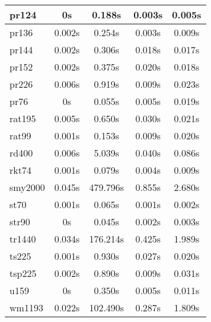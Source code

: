 \begin{longtable}{|l||c|c|c|c|}
  \hline
  pr124 & 0s & 0.188s & 0.003s & 0.005s \\
  \hline
  pr136 & 0.002s & 0.254s & 0.003s & 0.009s \\
  \hline
  pr144 & 0.002s & 0.306s & 0.018s & 0.017s \\
  \hline
  pr152 & 0.002s & 0.375s & 0.020s & 0.018s \\
  \hline
  pr226 & 0.006s & 0.919s & 0.009s & 0.023s \\
  \hline
  pr76 & 0s & 0.055s & 0.005s & 0.019s \\
  \hline
  rat195 & 0.005s & 0.650s & 0.030s & 0.021s \\
  \hline
  rat99 & 0.001s & 0.153s & 0.009s & 0.020s \\
  \hline
  rd400 & 0.006s & 5.039s & 0.040s & 0.086s \\
  \hline
  rkt74 & 0.001s & 0.079s & 0.004s & 0.009s \\
  \hline
  smy2000 & 0.045s & 479.796s & 0.855s & 2.680s \\
  \hline
  st70 & 0.001s & 0.065s & 0.001s & 0.002s \\
  \hline
  str90 & 0s & 0.045s & 0.002s & 0.003s \\
  \hline
  tr1440 & 0.034s & 176.214s & 0.425s & 1.989s \\
  \hline
  ts225 & 0.001s & 0.930s & 0.027s & 0.020s \\
  \hline
  tsp225 & 0.002s & 0.890s & 0.009s & 0.031s \\
  \hline
  u159 & 0s & 0.350s & 0.005s & 0.011s \\
  \hline
  wm1193 & 0.022s & 102.490s & 0.287s & 1.809s \\
  \hline
\end{longtable}